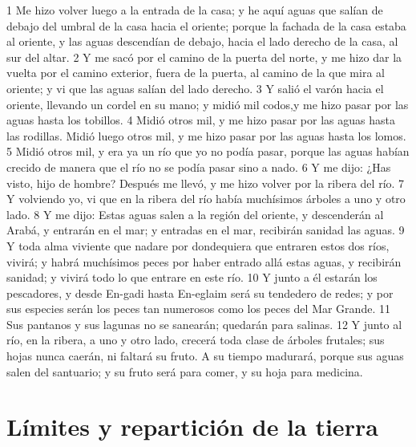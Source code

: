 1 Me hizo volver luego a la entrada de la casa; y he aquí aguas que salían de debajo del umbral de la casa hacia el oriente; porque la fachada de la casa estaba al oriente, y las aguas descendían de debajo, hacia el lado derecho de la casa, al sur del altar.
2 Y me sacó por el camino de la puerta del norte, y me hizo dar la vuelta por el camino exterior, fuera de la puerta, al camino de la que mira al oriente; y vi que las aguas salían del lado derecho.
3 Y salió el varón hacia el oriente, llevando un cordel en su mano; y midió mil codos,y me hizo pasar por las aguas hasta los tobillos.
4 Midió otros mil, y me hizo pasar por las aguas hasta las rodillas. Midió luego otros mil, y me hizo pasar por las aguas hasta los lomos.
5 Midió otros mil, y era ya un río que yo no podía pasar, porque las aguas habían crecido de manera que el río no se podía pasar sino a nado.
6 Y me dijo: ¿Has visto, hijo de hombre? Después me llevó, y me hizo volver por la ribera del río.
7 Y volviendo yo, vi que en la ribera del río había muchísimos árboles a uno y otro lado.
8 Y me dijo: Estas aguas salen a la región del oriente, y descenderán al Arabá, y entrarán en el mar; y entradas en el mar, recibirán sanidad las aguas.
9 Y toda alma viviente que nadare por dondequiera que entraren estos dos ríos, vivirá; y habrá muchísimos peces por haber entrado allá estas aguas, y recibirán sanidad; y vivirá todo lo que entrare en este río.
10 Y junto a él estarán los pescadores, y desde En-gadi hasta En-eglaim será su tendedero de redes; y por sus especies serán los peces tan numerosos como los peces del Mar Grande.
11 Sus pantanos y sus lagunas no se sanearán; quedarán para salinas.
12 Y junto al río, en la ribera, a uno y otro lado, crecerá toda clase de árboles frutales; sus hojas nunca caerán, ni faltará su fruto. A su tiempo madurará, porque sus aguas salen del santuario; y su fruto será para comer, y su hoja para medicina.

\section*{Límites y repartición de la tierra}

